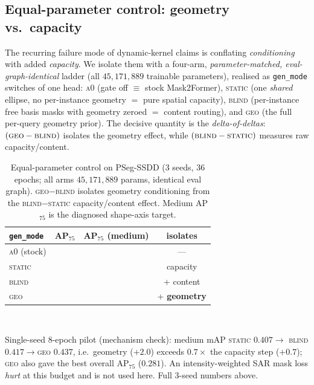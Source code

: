 \subsection{Equal-parameter control: geometry vs.\ capacity}
\label{ssec:geocontrol}
The recurring failure mode of dynamic-kernel claims is conflating \emph{conditioning} with added
\emph{capacity}. We isolate them with a four-arm, \emph{parameter-matched, eval-graph-identical}
ladder (all $45{,}171{,}889$ trainable parameters), realised as \texttt{gen\_mode} switches of one
head: \textsc{a0} (gate off $\equiv$ stock Mask2Former), \textsc{static} (one \emph{shared} ellipse,
no per-instance geometry $=$ pure spatial capacity), \textsc{blind} (per-instance free basis masks
with geometry zeroed $=$ content routing), and \textsc{geo} (the full per-query geometry prior).
The decisive quantity is the \emph{delta-of-deltas}: $(\textsc{geo}-\textsc{blind})$ isolates the
geometry effect, while $(\textsc{blind}-\textsc{static})$ measures raw capacity/content.

\begin{table}[t]\centering
\caption{Equal-parameter control on PSeg-SSDD (3 seeds, $36$ epochs; all arms
$45{,}171{,}889$ params, identical eval graph). \textsc{geo}$-$\textsc{blind} isolates geometry
conditioning from the \textsc{blind}$-$\textsc{static} capacity/content effect. Medium AP$_{75}$
is the diagnosed shape-axis target.}
\label{tab:geocontrol}
\begin{tabular}{@{}lccc@{}}
\toprule
\texttt{gen\_mode} & AP$_{75}$ & AP$_{75}$ (medium) & isolates \\
\midrule
\textsc{a0} (stock)     & \FULLtodo{} & \FULLtodo{} & --- \\
\textsc{static}         & \FULLtodo{} & \FULLtodo{} & capacity \\
\textsc{blind}          & \FULLtodo{} & \FULLtodo{} & + content \\
\textsc{geo}            & \FULLtodo{} & \FULLtodo{} & + \textbf{geometry} \\
\bottomrule
\end{tabular}
\\[2pt]\raggedright\footnotesize
Single-seed $8$-epoch pilot (mechanism check): medium mAP \textsc{static} $0.407\to$
\textsc{blind} $0.417\to$\textsc{geo} $0.437$, i.e.\ geometry ($+2.0$) exceeds $0.7\times$ the
capacity step ($+0.7$); \textsc{geo} also gave the best overall AP$_{75}$ ($0.281$). An
intensity-weighted SAR mask loss \emph{hurt} at this budget and is not used here. Full 3-seed
numbers above.
\end{table}

